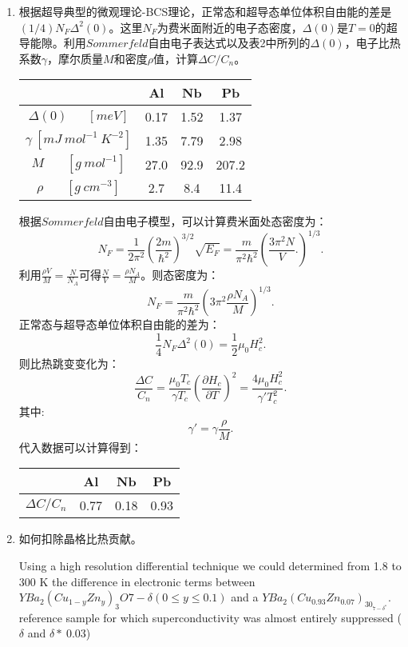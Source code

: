 \documentclass[reqno,a4paper,12pt]{amsart}
\begin{document}
\begin{enumerate}[1.]
\begin{enumerate}
	\item 根据超导典型的微观理论-BCS理论，正常态和超导态单位体积自由能的差是$(1/4)N_F \Delta^2(0)$。这里$N_F$为费米面附近的电子态密度，$\Delta(0)$是$T=0$的超导能隙。利用$Sommerfeld$自由电子表达式以及表2中所列的$\Delta(0)$，电子比热系数$\gamma$，摩尔质量$M$和密度$\rho$值，计算$\Delta C/C_n$。
	\begin{table}[h!]
	\centering
	\begin{tabular}{|c|c|c|c|}
		\hline
		{} & Al & Nb & Pb \\ \hline
		$\Delta(0) \ \ \ \ \ \ \ [meV]$ & 0.17 & 1.52 & 1.37 \\
		$\gamma \ [mJ \ mol^{-1} \ K^{-2}]$ & 1.35 & 7.79 & 2.98 \\
		$M \ \ \ \ \ \ \ \ [g \ mol^{-1}]$ & 27.0 & 92.9 & 207.2 \\
		$\rho \ \ \ \ \ \ \ \ [g \ cm^{-3}]$ & 2.7 & 8.4 & 11.4 \\
		\hline
	\end{tabular}
	\end{table}
	\begin{tcolorbox}[breakable, colback = black!5!white, colframe = black]
	根据$Sommerfeld$自由电子模型，可以计算费米面处态密度为：
	\[
		N_F = \frac{1}{2\pi^2} \left( \frac{2m}{\hbar^2} \right)^{3/2} \sqrt{E_F} = \frac{m}{\pi^2\hbar^2} \left( \frac{3\pi^2 N}{V}. \right)^{1/3}.
	\]
	利用$\frac{\rho V}{M} = \frac{N}{N_A}$可得$\frac{N}{V} = \frac{\rho N_A}{M}$。则态密度为：
	\[
		N_F = \frac{m}{\pi^2\hbar^2} \left( 3\pi^2 \frac{\rho N_A}{M} \right)^{1/3}.
	\]
	正常态与超导态单位体积自由能的差为：
	\[
		\frac{1}{4} N_F \Delta^2(0) = \frac{1}{2}\mu_0 H_c^2.
	\]
	则比热跳变变化为：
	\[
		\frac{\Delta C}{C_n} = \frac{\mu_0 T_c}{\gamma T_c}\left( \frac{\partial H_c}{\partial T} \right)^2 = \frac{4\mu_0 H_c^2}{\gamma' T_c^2}.
	\]
	其中:
	\[
		\gamma' = \gamma\frac{\rho}{M}.
	\]
	代入数据可以计算得到：
	\begin{table}[H]
	\centering
	\begin{tabular}{|c|c|c|c|}
		\hline
		{} & Al & Nb & Pb \\ \hline
		$\Delta C/C_n$ & {0.77} & {0.18} & {0.93} \\ 
		\hline
	\end{tabular}
	\end{table}
	\end{tcolorbox}
	
	\item 如何扣除晶格比热贡献。
	\begin{tcolorbox}[breakable, colback = black!5!white, colframe = black]
	Using a high resolution differential technique we could determined  from 1.8 to 300 K the difference in electronic terms between $YBa_2(Cu_{1-y}Zn_y)_3O{7-\delta}(0\leq y\leq 0.1)$ and a $YBa_2(Cu_{0.93}Zn_{0.07})_30_{7-\delta^*}$. reference sample for which superconductivity was almost entirely suppressed ($\delta$ and $\delta*~0.03$)
	\end{tcolorbox}
\end{enumerate}

\end{enumerate}
\end{document}
